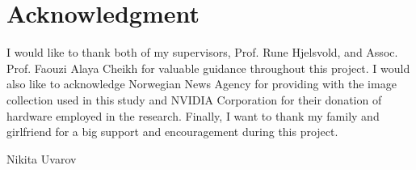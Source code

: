 \chapter*{Acknowledgment}
I would like to thank both of my supervisors, Prof. Rune Hjelsvold, and Assoc. Prof. Faouzi Alaya Cheikh for valuable guidance throughout this project. I would also like to acknowledge Norwegian News Agency for providing with the image collection used in this study and NVIDIA Corporation for their donation of hardware employed in the research. Finally, I want to thank my family and girlfriend for a big support and encouragement during this project.
\begin{flushright}
Nikita Uvarov\\[1pc]
\end{flushright}
